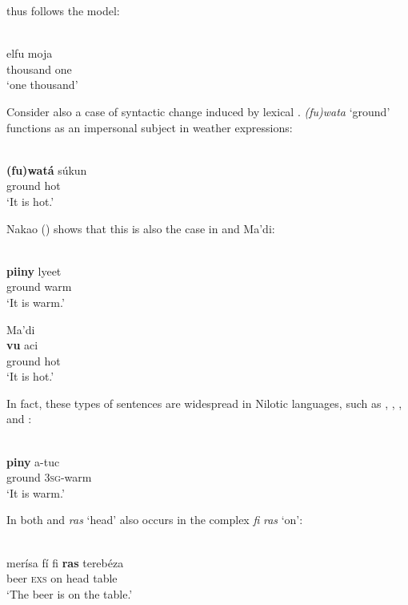 \documentclass[output=paper]{langsci/langscibook}
\begin{document}
 thus follows the  model:

\ea
{ \citep[309]{Luffin2014}}\\
\gll            elfu moja \\
                thousand one \\
\glt     `one thousand'
\z

Consider also a case of syntactic change induced by lexical .   \textit{(fu)wata} ‘ground’ functions as an impersonal subject in weather expressions:

\ea
{  \citep[141]{Nakao2012}}\\
\gll   \textbf{(fu)watá} súkun\\
       ground hot\\
\glt     `It is hot.'
\z

Nakao (\citeyear[141]{Nakao2012}) shows that this is also the case in  and Ma'di:

\ea
{ \citep[141]{Nakao2012}}\\
\gll \textbf{piiny} lyeet\\
     ground warm\\
\glt     `It is warm.'
\z

\ea
{Ma'di \citep[141]{Nakao2012}}\\
\gll \textbf{vu} aci\\
     ground hot\\
\glt     `It is hot.'
\z

In fact, these types of sentences are widespread in  Nilotic  languages, such as , , , and :

\ea
{ \citep[202]{Nebel1979}}\\
\gll            \textbf{piny} a-tuc\\
                ground 3\textsc{sg}-warm\\
\glt     `It is warm.'
\z

  In both   and  \textit{ras} ‘head’ also occurs in the complex  \textit{fi} \textit{ras} ‘on’:

\ea
\ea {}  \citep[141]{Nakao2012}\\
\gll     merísa fí fi \textbf{ras} terebéza\\
         beer \textsc{exs} on head table\\
\glt       `The beer is on the table.'
\end{document}
